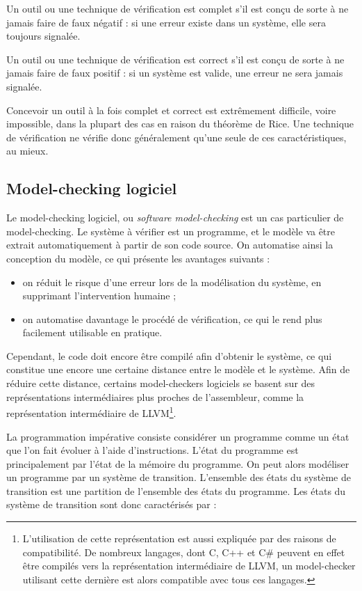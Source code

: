 Un outil ou une technique de vérification est complet s’il est conçu de sorte à
ne jamais faire de faux négatif : si une erreur existe dans un système, elle
sera toujours signalée.

Un outil ou une technique de vérification est correct s’il est conçu de sorte à
ne jamais faire de faux positif : si un système est valide, une erreur ne sera
jamais signalée.

Concevoir un outil à la fois complet et correct est extrêmement difficile, voire
impossible, dans la plupart des cas en raison du théorème de Rice. Une technique
de vérification ne vérifie donc généralement qu'une seule de ces
caractéristiques, au mieux.

\subsection{Model-checking logiciel}

Le model-checking logiciel, ou \emph{software model-checking} est un cas
particulier de model-checking. Le système à vérifier est un programme, et le
modèle va être extrait automatiquement à partir de son code source.
On automatise ainsi la conception du modèle, ce qui présente les avantages
suivants :

\begin{itemize}
\item
  on réduit le risque d'une erreur lors de la modélisation du système,
  en supprimant l'intervention humaine ;
\item
  on automatise davantage le procédé de vérification, ce qui le rend
  plus facilement utilisable en pratique.
\end{itemize}

Cependant, le code doit encore être compilé afin d'obtenir le système,
ce qui constitue une encore une certaine distance entre le modèle et le
système. Afin de réduire cette distance, certains
model-checkers logiciels se basent sur des représentations intermédiaires
plus proches de l'assembleur, comme la représentation intermédiaire de
LLVM\footnote{L'utilisation de cette représentation est aussi expliquée
  par des raisons de compatibilité. De nombreux langages, dont C, C++ et
  C\# peuvent en effet être compilés vers la représentation
  intermédiaire de LLVM, un model-checker utilisant cette dernière est
  alors compatible avec tous ces langages.}.

La programmation impérative consiste considérer un programme comme un état que
l'on fait évoluer à l'aide d'instructions. L'état du programme est
principalement par l'état de la mémoire du programme.
On peut alors modéliser un programme par un système de transition. L'ensemble
des états du système de transition est une partition de l'ensemble des états du
programme. Les états du système de transition sont donc caractérisés par :

